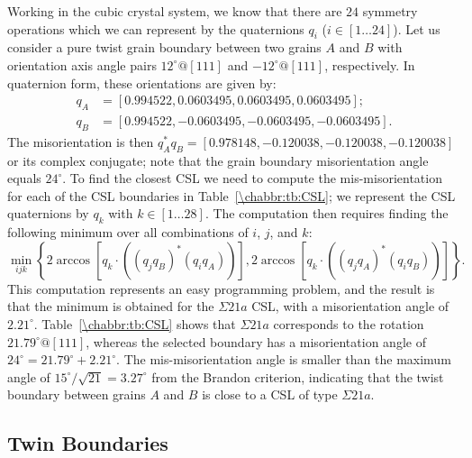 Working in the cubic crystal system, we know that there are $24$ symmetry operations which we can represent by the quaternions $q_i$ ($i\in[1\ldots 24]$). Let us consider a pure twist grain boundary between two grains $A$ and $B$ with orientation axis angle pairs $12^{\circ}@[111]$ and $-12^{\circ}@[111]$, respectively.   In quaternion form, these orientations are given by:
\begin{align*}
	q_A &= [0.994522, 0.0603495, 0.0603495, 0.0603495];\\
	q_B &= [0.994522,-0.0603495, -0.0603495, -0.0603495].
\end{align*}
The misorientation is then $q^{\ast}_Aq_B = [0.978148, -0.120038, -0.120038, -0.120038]$ or its complex conjugate; note that the grain boundary misorientation angle equals $24^{\circ}$.  To find the closest CSL we need to compute the mis-misorientation for each of the CSL boundaries in Table~\ref{\chabbr:tb:CSL}; we represent the CSL quaternions by $q_k$ with $k\in[1\ldots 28]$.  The computation then requires finding the following minimum over all combinations of $i$, $j$, and $k$:
\[
	\min_{ijk}\left\{2\arccos[q_k\cdot((q_jq_B)^{\ast}(q_iq_A))],2\arccos[q_k\cdot((q_jq_A)^{\ast}(q_iq_B))] \right\}.
\]
This computation represents an easy programming problem, and the result is that the minimum is obtained for the $\Sigma 21a$ CSL, with a misorientation angle of $2.21^{\circ}$. Table~\ref{\chabbr:tb:CSL} shows that $\Sigma 21a$ corresponds to the rotation $21.79^{\circ}@[111]$, whereas the selected boundary has a misorientation angle of $24^{\circ} = 21.79^{\circ}+2.21^{\circ}$. The mis-misorientation angle is smaller than the maximum angle of $15^{\circ}/\sqrt{21}=3.27^{\circ}$ from the Brandon criterion, indicating that the twist boundary between grains $A$ and $B$ is close to a CSL of type $\Sigma 21a$.



\subsection{Twin Boundaries}\label{\chabbr:sec:twinning}

